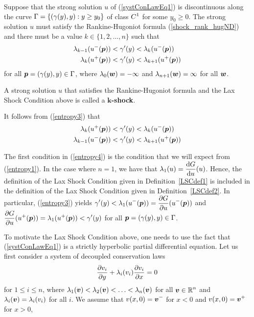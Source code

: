 \begin{defn}  \label{LSCdef2}
Suppose that the strong solution $u$ of (\ref{systConLawEq1}) is discontinuous
along the curve
$\displaystyle \Gamma = \left\{ (\gamma(y),y) : y \geq y_0 \right\}$
of class $\displaystyle C^1$ for some $y_0 \geq 0$.  The strong solution $u$
must satisfy the Rankine-Hugoniot formula (\ref{shock_rank_hugND}) and
there must be a value $k \in \{1,2,\ldots,n\}$ such that
\begin{equation} \label{entropy3}
\begin{split}
\lambda_{k-1}(u^-({\bm{p}})) &< \gamma'(y) < \lambda_k(u^-({\bm{p}})) \\
\lambda_{k}(u^+({\bm{p}})) &< \gamma'(y) < \lambda_{k+1}(u^+({\bm{p}}))
\end{split}
\end{equation}
for all ${\bm{p}}=(\gamma(y),y) \in \Gamma$, where
$\lambda_0({\bm{w}}) = -\infty$ and $\lambda_{n+1}({\bm{w}}) = \infty$
for all ${\bm{w}}$.  

A strong solution $u$ that satisfies the Rankine-Hugoniot formula and
the Lax Shock Condition above is called a
{\bfseries $\mathbf{k}$-shock}.
\end{defn}

It follows from (\ref{entropy3}) that
\begin{equation} \label{entropy4}
\begin{split}
\lambda_k(u^+({\bm{p}})) &< \gamma'(y) < \lambda_k(u^-({\bm{p}})) \\
\lambda_{k-1}(u^-({\bm{p}})) &< \gamma'(y) < \lambda_{k+1}(u^+({\bm{p}}))
\end{split}
\end{equation}

The first condition in (\ref{entropy4}) is the
condition that we will expect from (\ref{entropy1}).
In the case where $n=1$, we have that
$\displaystyle \lambda_1(u) = \frac{\mathrm{d}G}{\mathrm{d}{u}}(u)$.  Hence,
the definition of the Lax Shock Condition given in Definition~\ref{LSCdef1}
is included in the definition of the Lax Shock Condition given in
Definition~\ref{LSCdef2}.  In particular, (\ref{entropy3}) yields
$\displaystyle \gamma'(y) < \lambda_1(u^-({\bm{p}}))
= \frac{\partial{G}}{\partial u}(u^-({\bm{p}}))$ and
$\displaystyle \frac{\partial{G}}{\partial u}(u^+({\bm{p}})) = \lambda_1(u^+({\bm{p}}))
< \gamma'(y)$ for all ${\bm{p}}=(\gamma(y),y) \in \Gamma$.

To motivate the Lax Shock Condition above, one needs to use the fact that
(\ref{systConLawEq1}) is a strictly hyperbolic partial differential equation.
Let us first consider a system of decoupled conservation laws
\begin{equation} \label{systConLawEq3}
\frac{\partial{v_i}}{\partial y} + \lambda_i(v_i) \frac{\partial{v_i}}{\partial x} = 0
\end{equation}
for $1 \leq i \leq n$, where
$\lambda_1({\bm{v}}) < \lambda_2({\bm{v}}) < \ldots < \lambda_n({\bm{v}})$
for all $\displaystyle {\bm{v}} \in \mathbb{R}^n$
and $\lambda_i({\bm{v}}) = \lambda_i(v_i)$ for all $i$.
We assume that $\displaystyle v(x,0) = {\bm{v}}^-$ for $x<0$ and
$\displaystyle v(x,0) = {\bm{v}}^+$ for $x>0$, 

